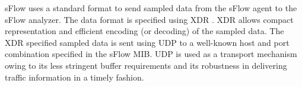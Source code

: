 sFlow uses a standard format to send sampled data from the sFlow agent to the sFlow analyzer. The data format is specified using \ac{XDR} \cite{rfc1014}. \ac{XDR} allows compact representation and efficient encoding (or decoding) of the sampled data. The  \ac{XDR} specified sampled data is sent using \ac{UDP} to a well-known host and port combination specified in the sFlow \ac{MIB}. \ac{UDP} is used as a transport mechanism owing to its less stringent buffer requirements and its robustness in delivering traffic information in a timely fashion.  




